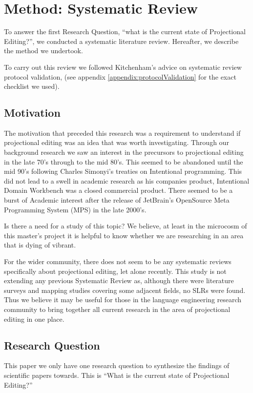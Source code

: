 \chapter{Method: Systematic Review}\label{chapter:Method_systematic_review}

To answer the first Research Question, ``what is the current state of Projectional Editing?'', we conducted a systematic literature review.
Hereafter, we describe the method we undertook.

To carry out this review we followed Kitchenham's\cite{Kitchenham_2015} advice on systematic review protocol validation, (see appendix \ref{appendix:protocolValidation} for the exact checklist we used).

\section{Motivation}
The motivation that preceded this research was a requirement to understand if projectional editing was an idea that was worth investigating.
Through our background research we saw an interest in the precursors to projectional editing in the late 70's through to the mid 80's.
This seemed to be abandoned until the mid 90's following Charles Simonyi's treaties on Intentional programming.
This did not lead to a swell in academic research as his companies product, Intentional Domain Workbench was a closed commercial product.
There seemed to be a burst of Academic interest after the release of JetBrain's OpenSource Meta Programming System (MPS) in the late 2000's.

Is there a need for a study of this topic? 
We believe, at least in the microcosm of this master's project it is helpful to know whether we are researching in an area that is dying of vibrant.

For the wider community, there does not seem to be any systematic reviews specifically about projectional editing, let alone recently.
This study is not extending any previous Systematic Review as, although there were literature surveys and mapping studies covering some adjacent fields, no SLRs were found.  
Thus we believe it may be useful for those in the language engineering research community to bring together all current research in the area of projectional editing in one place.

\section{Research Question}
This paper we only have one research question to synthesize the findings of scientific papers towards.
This is ``What is the current state of Projectional Editing?''

